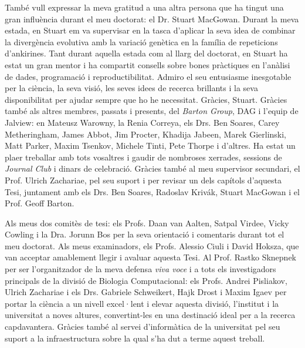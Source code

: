 També vull expressar la meva gratitud a una altra persona que ha tingut una gran influència durant el meu doctorat: el Dr. Stuart MacGowan. Durant la meva estada, en Stuart em va supervisar en la tasca d'aplicar la seva idea de combinar la divergència evolutiva amb la variació genètica en la família de repeticions d'ankirines. Tant durant aquella estada com al llarg del doctorat, en Stuart ha estat un gran mentor i ha compartit consells sobre bones pràctiques en l'anàlisi de dades, programació i reproductibilitat. Admiro el seu entusiasme inesgotable per la ciència, la seva visió, les seves idees de recerca brillants i la seva disponibilitat per ajudar sempre que ho he necessitat. Gràcies, Stuart. Gràcies també als altres membres, passats i presents, del \textit{Barton Group}, DAG i l'equip de Jalview: en Mateusz Warowny, la Renia Correya, els Drs. Ben Soares, Carey Metheringham, James Abbot, Jim Procter, Khadija Jabeen, Marek Gierlinski, Matt Parker, Maxim Tsenkov, Michele Tinti, Pete Thorpe i d'altres. Ha estat un plaer treballar amb tots vosaltres i gaudir de nombroses xerrades, sessions de \textit{Journal Club} i dinars de celebració. Gràcies també al meu supervisor secundari, el Prof. Ulrich Zachariae, pel seu suport i per revisar un dels capítols d'aquesta Tesi, juntament amb els Drs. Ben Soares, Radoslav Krivák, Stuart MacGowan i el Prof. Geoff Barton.

Als meus dos comitès de tesi: els Profs. Daan van Aalten, Satpal Virdee, Vicky Cowling i la Dra. Jorunn Bos per la seva orientació i comentaris durant tot el meu doctorat. Als meus examinadors, els Profs. Alessio Ciuli i David Hoksza, que van acceptar amablement llegir i avaluar aquesta Tesi. Al Prof. Rastko Sknepnek per ser l'organitzador de la meva defensa \textit{viva voce} i a tots els investigadors principals de la divisió de Biologia Computacional: els Profs. Andrei Pisliakov, Ulrich Zachariae i els Drs. Gabriele Schweikert, Hajk Drost i Maxim Igaev per portar la ciència a un nivell excel·lent i elevar aquesta divisió, l'institut i la universitat a noves altures, convertint-les en una destinació ideal per a la recerca capdavantera. Gràcies també al servei d'informàtica de la universitat pel seu suport a la infraestructura sobre la qual s'ha dut a terme aquest treball.


